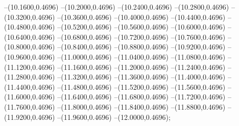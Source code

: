 {	--(10.1600,0.4696)
	--(10.2000,0.4696)
	--(10.2400,0.4696)
	--(10.2800,0.4696)
	--(10.3200,0.4696)
	--(10.3600,0.4696)
	--(10.4000,0.4696)
	--(10.4400,0.4696)
	--(10.4800,0.4696)
	--(10.5200,0.4696)
	--(10.5600,0.4696)
	--(10.6000,0.4696)
	--(10.6400,0.4696)
	--(10.6800,0.4696)
	--(10.7200,0.4696)
	--(10.7600,0.4696)
	--(10.8000,0.4696)
	--(10.8400,0.4696)
	--(10.8800,0.4696)
	--(10.9200,0.4696)
	--(10.9600,0.4696)
	--(11.0000,0.4696)
	--(11.0400,0.4696)
	--(11.0800,0.4696)
	--(11.1200,0.4696)
	--(11.1600,0.4696)
	--(11.2000,0.4696)
	--(11.2400,0.4696)
	--(11.2800,0.4696)
	--(11.3200,0.4696)
	--(11.3600,0.4696)
	--(11.4000,0.4696)
	--(11.4400,0.4696)
	--(11.4800,0.4696)
	--(11.5200,0.4696)
	--(11.5600,0.4696)
	--(11.6000,0.4696)
	--(11.6400,0.4696)
	--(11.6800,0.4696)
	--(11.7200,0.4696)
	--(11.7600,0.4696)
	--(11.8000,0.4696)
	--(11.8400,0.4696)
	--(11.8800,0.4696)
	--(11.9200,0.4696)
	--(11.9600,0.4696)
	--(12.0000,0.4696);
}
